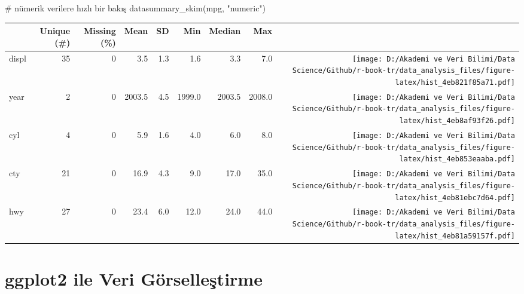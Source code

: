 \documentclass[
  letterpaper,
  DIV=11,
  numbers=noendperiod]{scrreprt}
\newenvironment{Shaded}{\begin{snugshade}}{\end{snugshade}}
\newcommand{\CommentTok}[1]{\textcolor[rgb]{0.37,0.37,0.37}{#1}}
\newcommand{\FunctionTok}[1]{\textcolor[rgb]{0.28,0.35,0.67}{#1}}
\newcommand{\NormalTok}[1]{\textcolor[rgb]{0.00,0.23,0.31}{#1}}
\newcommand{\StringTok}[1]{\textcolor[rgb]{0.13,0.47,0.30}{#1}}
\begin{document}
\begin{Shaded}
\begin{Highlighting}[]
\CommentTok{\# nümerik verilere hızlı bir bakış}
\FunctionTok{datasummary\_skim}\NormalTok{(mpg, }\StringTok{"numeric"}\NormalTok{)}
\end{Highlighting}
\end{Shaded}

\begin{table}
\centering
\begin{tabular}[t]{lrrrrrrr>{}r}
\toprule
  & Unique (\#) & Missing (\%) & Mean & SD & Min & Median & Max &   \\
\midrule
displ & 35 & 0 & \num{3.5} & \num{1.3} & \num{1.6} & \num{3.3} & \num{7.0} & \texttt{[image: D:/Akademi ve Veri Bilimi/Data Science/Github/r-book-tr/data\_analysis\_files/figure-latex/hist\_4eb821f85a71.pdf]}\\
year & 2 & 0 & \num{2003.5} & \num{4.5} & \num{1999.0} & \num{2003.5} & \num{2008.0} & \texttt{[image: D:/Akademi ve Veri Bilimi/Data Science/Github/r-book-tr/data\_analysis\_files/figure-latex/hist\_4eb8af93f26.pdf]}\\
cyl & 4 & 0 & \num{5.9} & \num{1.6} & \num{4.0} & \num{6.0} & \num{8.0} & \texttt{[image: D:/Akademi ve Veri Bilimi/Data Science/Github/r-book-tr/data\_analysis\_files/figure-latex/hist\_4eb853eaaba.pdf]}\\
cty & 21 & 0 & \num{16.9} & \num{4.3} & \num{9.0} & \num{17.0} & \num{35.0} & \texttt{[image: D:/Akademi ve Veri Bilimi/Data Science/Github/r-book-tr/data\_analysis\_files/figure-latex/hist\_4eb81ebc7d64.pdf]}\\
hwy & 27 & 0 & \num{23.4} & \num{6.0} & \num{12.0} & \num{24.0} & \num{44.0} & \texttt{[image: D:/Akademi ve Veri Bilimi/Data Science/Github/r-book-tr/data\_analysis\_files/figure-latex/hist\_4eb81a59157f.pdf]}\\
\bottomrule
\end{tabular}
\end{table}


\chapter*{ggplot2 ile Veri
Görselleştirme}\label{ggplot2-ile-veri-guxf6rselleux15ftirme}

\end{document}
